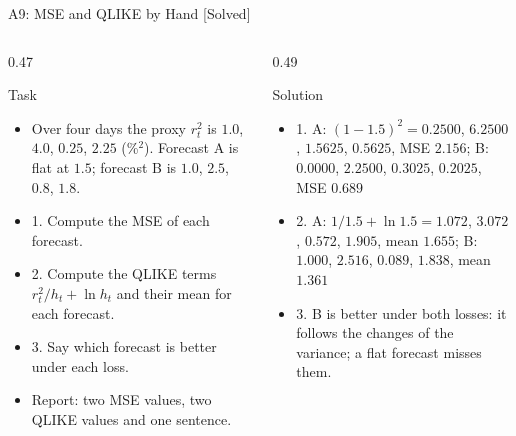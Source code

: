 \begin{frame}{A9: MSE and QLIKE by Hand [Solved]}
\itemsize{\scriptsize}
\begin{columns}[T]
\begin{column}{0.47\textwidth}
\begin{block}{Task}
\begin{itemize}
    \item Over four days the proxy $r_t^2$ is $1.0$, $4.0$, $0.25$, $2.25$ (\%$^2$). Forecast A is flat at $1.5$; forecast B is $1.0$, $2.5$, $0.8$, $1.8$.
    \item 1. Compute the MSE of each forecast.
    \item 2. Compute the QLIKE terms $r_t^2/h_t + \ln h_t$ and their mean for each forecast.
    \item 3. Say which forecast is better under each loss.
    \item Report: two MSE values, two QLIKE values and one sentence.
\end{itemize}
\end{block}
\end{column}
\begin{column}{0.49\textwidth}
\begin{exampleblock}{Solution}
\begin{itemize}
    \item 1. A: $(1 - 1.5)^2 = 0.2500$, $6.2500$, $1.5625$, $0.5625$, MSE $2.156$; B: $0.0000$, $2.2500$, $0.3025$, $0.2025$, MSE $0.689$
    \item 2. A: $1/1.5 + \ln 1.5 = 1.072$, $3.072$, $0.572$, $1.905$, mean $1.655$; B: $1.000$, $2.516$, $0.089$, $1.838$, mean $1.361$
    \item 3. B is better under both losses: it follows the changes of the variance; a flat forecast misses them.
\end{itemize}
\end{exampleblock}
\end{column}
\end{columns}
\end{frame}

